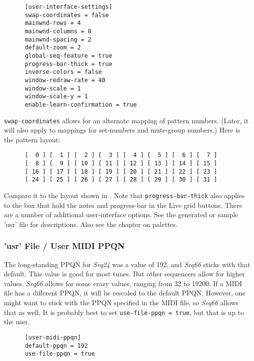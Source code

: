    \begin{verbatim}
      [user-interface-settings]
      swap-coordinates = false
      mainwnd-rows = 4
      mainwnd-columns = 8
      mainwnd-spacing = 2
      default-zoom = 2
      global-seq-feature = true
      progress-bar-thick = true
      inverse-colors = false
      window-redraw-rate = 40
      window-scale = 1
      window-scale-y = 1
      enable-learn-confirmation = true
   \end{verbatim}

   \texttt{swap-coordinates} allows for an alternate mapping of pattern
   numbers.  (Later, it will also apply to mappings for set-numbers and
   mute-group numbers.)  Here is the pattern layout:

   \begin{verbatim}
      [  0 ] [  1 ] [  2 ] [  3 ] [  4 ] [  5 ] [  6 ] [  7 ]
      [  8 ] [  9 ] [ 10 ] [ 11 ] [ 12 ] [ 13 ] [ 14 ] [ 15 ]
      [ 16 ] [ 17 ] [ 18 ] [ 19 ] [ 20 ] [ 21 ] [ 22 ] [ 23 ]
      [ 24 ] [ 25 ] [ 26 ] [ 27 ] [ 28 ] [ 29 ] [ 30 ] [ 31 ]
   \end{verbatim}

   Compare it to the layout shown in
   .
   Note that \texttt{progress-bar-thick} also applies to the box that hold the
   notes and progress-bar in the Live grid buttons.
   There are a number of additional user-interface options.  See the generated
   or sample 'usr' file for descriptions.  Also see the chapter on palettes.

\subsubsection{'usr' File / User MIDI PPQN}
\label{subsubsec:usr_file_user_midi_ppqn}

   The long-standing PPQN for \textsl{Seq24} was a value of 192, and
   \textsl{Seq66} sticks with that default.
   This value is good for most tunes. But other sequencers allow for higher
   values. \textsl{Seq66} allows for some crazy values, ranging from
   32 to 19200.  If a MIDI file has a different PPQN, it will be rescaled to
   the default PPQN.  However, one might want to stick with the PPQN
   specified in the MIDI file, so \textsl{Seq66} allows that as well.
   It is probably best to set \texttt{use-file-ppqn = true}, but that is
   up to the user.

   \begin{verbatim}
      [user-midi-ppqn]
      default-ppqn = 192
      use-file-ppqn = true
   \end{verbatim}

